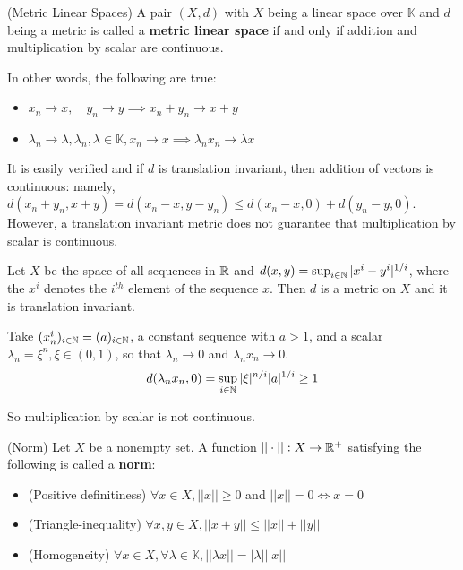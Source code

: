 \begin{defn}
    (Metric Linear Spaces) 
    A pair $(X, d)$ with $X$ being a linear space over $\mathbb{K}$ and $d$ being a metric is called a \textbf{metric linear space} if and only if
    addition and multiplication by scalar are continuous.
\end{defn}   


In other words, the following are true:  

\begin{itemize}
    \item $x_n \to x, \quad y_n \to y \implies x_n + y_n \to x + y$
    \item $\lambda_n \to \lambda, \lambda_n, \lambda \in \mathbb{K},  x_n \to x \implies \lambda_n x_n \to \lambda x$
\end{itemize}  

It is easily verified and if $d$ is translation invariant, then addition of vectors is continuous: namely,
$d(x_n+y_n, x+y)=d(x_n-x, y-y_n) \leq d(x_n-x,0)+ d(y_n-y, 0)$.  However, a translation invariant metric does not
guarantee that multiplication by scalar is continuous.  

\begin{eg}
    Let $X$ be the space of all sequences in $\mathbb{R}$ and $d(x,y) = \sup_{i\in \mathbb{N}} |x^i-y^i|^{1/i}$, where the $x^i$
    denotes the $i^{th}$ element of the sequence $x$. Then $d$ is a metric on $X$ and it is translation invariant.  
    
    Take $(x^i_n)_{i\in \mathbb{N}}=(a)_{i \in \mathbb{N}}$, a constant sequence with $a>1$, and a scalar $\lambda_n = \xi^n, \xi \in (0,1)$, so that $\lambda_n \to 0$
    and $\lambda_n x_n \to 0$.  
    \begin{equation*}
        d(\lambda_n x_n, 0) = \sup_{i\in \mathbb{N}} |\xi|^{n/i} |a|^{1/i} \geq 1
    \end{equation*}  

    So multiplication by scalar is not continuous.
\end{eg}

\begin{defn}
    (Norm) Let $X$ be a nonempty set. A function $||\cdot||: X \to \mathbb{R}^+$ satisfying the following 
    is called a \textbf{norm}:
    \begin{itemize}
        \item (Positive definitiness) $\forall x \in X, ||x|| \geq 0$ and $||x||=0 \iff x=0$
        \item (Triangle-inequality) $\forall x,y \in X, ||x+y|| \leq ||x|| + ||y||$
        \item (Homogeneity) $\forall x \in X, \forall \lambda \in \mathbb{K}, ||\lambda x|| = |\lambda| ||x||$
    \end{itemize}
\end{defn}  

